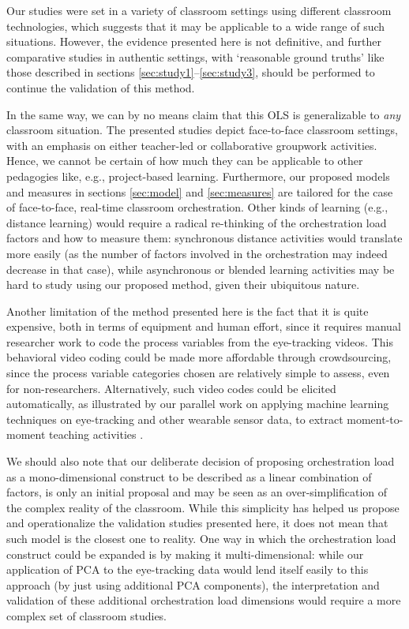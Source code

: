 \documentclass[10pt,journal,compsoc]{IEEEtran}
\begin{document}
Our studies were set in a variety of classroom settings using different classroom technologies, which suggests that it may be applicable to a wide range of such situations. However, the evidence presented here is not definitive, and further comparative studies in authentic settings, with `reasonable ground truths' like those described in sections \ref{sec:study1}--\ref{sec:study3}, should be performed to continue the validation of this method.

In the same way, we can by no means claim that this OLS is generalizable to \textit{any} classroom situation. The presented studies depict face-to-face classroom settings, with an emphasis on either teacher-led or collaborative groupwork activities. Hence, we cannot be certain of how much they can be applicable to other pedagogies like, e.g., project-based learning. Furthermore, our proposed models and measures in sections \ref{sec:model} and \ref{sec:measures} are tailored for the case of face-to-face, real-time classroom orchestration. Other kinds of learning (e.g., distance learning) would require a radical re-thinking of the orchestration load factors and how to measure them: synchronous distance activities would translate more easily (as the number of factors involved in the orchestration may indeed decrease in that case), while asynchronous or blended learning activities may be hard to study using our proposed method, given their ubiquitous nature.

Another limitation of the method presented here is the fact that it is quite expensive, both in terms of equipment and human effort, since it requires manual researcher work to code the process variables from the eye-tracking videos. This behavioral video coding could be made more affordable through crowdsourcing, since the process variable categories chosen are relatively simple to assess, even for non-researchers. Alternatively, such video codes could be elicited automatically, as illustrated by our parallel work on applying machine learning techniques on eye-tracking and other wearable sensor data, to extract moment-to-moment teaching activities \cite{prieto2016teaching}.

We should also note that our deliberate decision of proposing orchestration load as a mono-dimensional construct to be described as a linear combination of factors, is only an initial proposal and may be seen as an over-simplification of the complex reality of the classroom. While this simplicity has helped us propose and operationalize the validation studies presented here, it does not mean that such model is the closest one to  reality. One way in which the orchestration load construct could be expanded is by making it multi-dimensional: while our application of PCA to the eye-tracking data would lend itself easily to this approach (by just using additional PCA components), the interpretation and validation of these additional orchestration load dimensions would require a more complex set of classroom studies.
\end{document}
